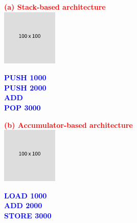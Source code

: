 \documentclass[
  14pt,
  a4paper,
  DIV=11,
  numbers=noendperiod,
  headinclude=true,
  footinclude=true]{scrreprt}
\begin{document}
\begin{figure}

\begin{minipage}{0.65\linewidth}
\textcolor{red}{\textbf{(a) Stack-based architecture}}\\
\includegraphics{index_files/mediabag/FiKGhYhhIWJYiBgWIoaF.png}\end{minipage}%
%
\begin{minipage}{0.35\linewidth}

\begin{tcolorbox}[colback=boxbodycol, colframe=boxbodycol]
\textcolor{blue}{\textbf{PUSH 1000}}\\
\textcolor{blue}{\textbf{PUSH 2000}}\\
\textcolor{blue}{\textbf{ADD}}\\
\textcolor{blue}{\textbf{POP 3000}}

\end{tcolorbox}

\end{minipage}%

\end{figure}%

\begin{figure}

\begin{minipage}{0.65\linewidth}
\textcolor{red}{\textbf{(b) Accumulator-based architecture}}\\
\includegraphics{index_files/mediabag/FiKGhYhhIWJYiBgWIoaF.png}\end{minipage}%
%
\begin{minipage}{0.35\linewidth}

\begin{tcolorbox}[colback=boxbodycol, colframe=boxbodycol]
\textcolor{blue}{\textbf{LOAD 1000}}\\
\textcolor{blue}{\textbf{ADD 2000}}\\
\textcolor{blue}{\textbf{STORE 3000}}

\end{tcolorbox}

\end{minipage}%

\end{figure}%
\end{document}
